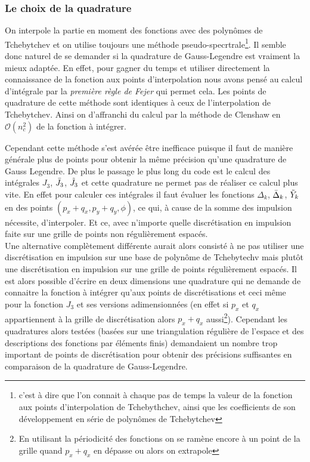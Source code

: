\documentclass[10.5pt]{article}
\begin{document}
\begin{multicols}{2}
\subsubsection{Le choix de la quadrature}

On interpole la partie en moment des fonctions avec des polynômes de Tchebytchev et on utilise toujours une méthode pseudo-specrtrale\footnote{c'est à dire que l'on connait à chaque pas de temps la valeur de la fonction aux points d'interpolation de Tchebythchev, ainsi que les coefficients de son développement en série de polynômes de Tchebytchev}. Il semble donc naturel de se demander si la quadrature de Gauss-Legendre est vraiment la mieux adaptée. En effet, pour gagner du temps et utiliser directement la connaissance de la fonction aux points d'interpolation nous avons pensé au calcul d'intégrale par la \emph{première règle de Fejer} \cite{waldvogel2006fast} qui permet cela. Les points de quadrature de cette méthode sont identiques à ceux de l'interpolation de Tchebytchev. Ainsi on d'affranchi du calcul par la méthode de Clenshaw en $\mathcal{O}(n_c^2)$ de la fonction à intégrer. 
 
Cependant cette méthode s'est avérée être inefficace puisque il faut de manière générale plus de points pour obtenir la même précision qu'une quadrature de Gauss Legendre. De plus le passage le plus long du code est le calcul des intégrales $J_3$, $\bar{J}_3$, $\tilde{J}_3$ et cette quadrature ne permet pas de réaliser ce calcul plus vite. En effet pour calculer ces intégrales il faut évaluer les fonctions $\Delta_k$, $\bar{\Delta}_k$, $\tilde{Y}_k$ en des points $(p_x+q_x, p_y+q_y,\phi)$, ce qui, à cause de la somme des impulsion nécessite, d'interpoler. Et ce, avec n'importe quelle discrétisation en impulsion faite sur une grille de points non régulièrement espacés. \\

Une alternative complètement différente aurait alors consisté à ne pas utiliser une discrétisation en impulsion sur une base de polynôme de Tchebytechv mais plutôt une discrétisation en impulsion sur une grille de points régulièrement espacés. Il est alors possible d'écrire en deux dimensions une quadrature qui ne demande de connaitre la fonction à intégrer qu'aux points de discrétisations et ceci même pour la fonction $J_3$ et ses versions adimensionnées (en effet si  $p_x$ et $q_x$ appartiennent à la grille de discrétisation alors $p_x+q_x$ aussi\footnote{En utilisant la périodicité des fonctions on se ramène encore à un point de la grille quand $p_x+q_x$ en dépasse ou alors on extrapole}). Cependant les quadratures alors testées (basées sur une triangulation régulière de l'espace et des descriptions des fonctions par éléments finis) demandaient un nombre trop important de points de discrétisation pour obtenir des précisions suffisantes en comparaison de la quadrature de Gauss-Legendre.




\end{multicols}
\end{document}
